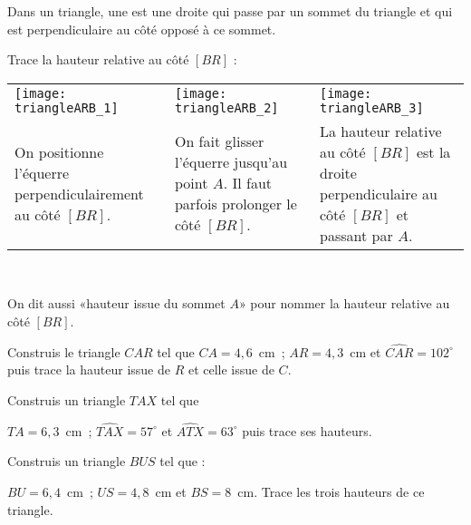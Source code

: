 \begin{methode*1}

\begin{aconnaitre}
Dans un triangle, une  est une droite qui passe par un sommet du triangle et qui est perpendiculaire au côté opposé à ce sommet.
\end{aconnaitre}

 \begin{exemple*1}
 Trace la hauteur relative au côté $[BR]$ :
 \begin{tabularx}{\textwidth}{X|X|X}
 \texttt{[image: triangleARB\_1]} &  \texttt{[image: triangleARB\_2]} & \texttt{[image: triangleARB\_3]} \\ 
 On positionne l'équerre perpendiculairement au côté $[BR]$. & On fait glisser l'équerre jusqu'au point $A$. Il faut parfois prolonger le côté $[BR]$. & La hauteur relative au côté $[BR]$ est la droite perpendiculaire au côté $[BR]$ et passant par $A$. \\
\end{tabularx} \\

\end{exemple*1}

\begin{remarque}
On dit aussi «hauteur issue du sommet $A$» pour nommer la hauteur relative au côté $[BR]$.
 \end{remarque}
 
\exercice
Construis le triangle $CAR$ tel que 
$CA = 4,6$ cm ; $AR = 4,3$ cm et $\widehat{CAR} = 102^\circ$ puis trace la hauteur issue de $R$ et celle issue de $C$.
     
\exercice
Construis un triangle $TAX$ tel que 

$TA = 6,3$ cm ; $\widehat{TAX} = 57^\circ$ et $\widehat{ATX} = 63^\circ$ puis trace ses hauteurs.

\exercice
Construis un triangle $BUS$ tel que :

$BU = 6,4$ cm ; $US = 4,8$ cm et $BS = 8$ cm. Trace les trois hauteurs de ce triangle.

\end{methode*1}


 
